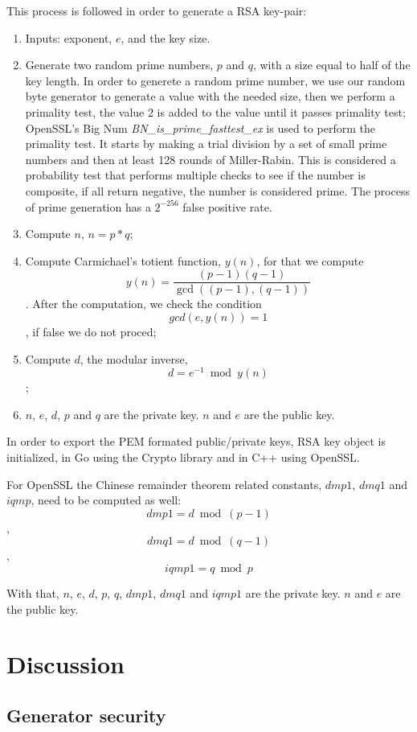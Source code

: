 \documentclass{article} %
\begin{document}
This process is followed in order to generate a RSA key-pair:
\begin{enumerate}
  \item Inputs: exponent, $e$, and the key size.
  \item Generate two random prime numbers, $p$ and $q$, with a size equal to half of the key length.
  In order to generete a random prime number, we use our random byte generator to generate
  a value with the needed size, then we perform a primality test, the value 2 is added to the value until it passes primality test;
  OpenSSL's Big Num \textit{BN\_is\_prime\_fasttest\_ex} is used to perform the primality test. It starts by making a trial division by a set of
  small prime numbers and then at least 128 rounds of Miller-Rabin. This is considered a probability
  test that performs multiple checks to see if the number is composite, if all return negative, the number is considered prime. The process of 
  prime generation has a $2^{-256}$ false positive rate.
  \item Compute $n$, $n=p*q$;
  \item Compute Carmichael's totient function, $y(n)$, for that we compute $$y(n)=\frac{(p-1)(q-1)}{\gcd((p-1),(q-1))}$$.
  After the computation, we check the condition $$gcd(e, y(n)) = 1$$, if false we do not proced;
  \item Compute $d$, the modular inverse, $$d=e^{-1} \bmod{y(n)}$$;
  \item $n$, $e$, $d$, $p$ and $q$ are the private key. $n$ and $e$ are the public key.
\end{enumerate}

In order to export the PEM formated public/private keys, RSA key object is initialized, in Go using the Crypto library and in C++ using OpenSSL.

For OpenSSL the Chinese remainder theorem related constants, $dmp1$, $dmq1$ and $iqmp$, need to be computed as well:
$$dmp1=d \bmod{(p-1)}$$, $$dmq1=d \bmod{(q-1)}$$, $$iqmp1=q \bmod{p}$$

With that, $n$, $e$, $d$, $p$, $q$, $dmp1$, $dmq1$ and $iqmp1$ are the private key. $n$ and $e$ are the public key.

\section{Discussion}
\subsection{Generator security}
\end{document}
